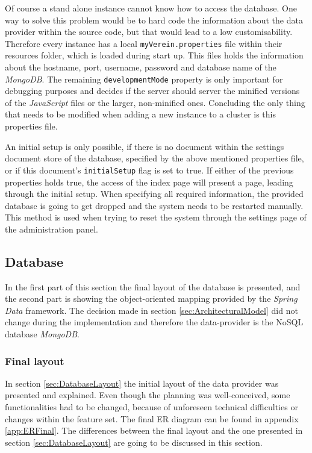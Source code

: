 Of course a stand alone instance cannot know how to access the database. One way to solve this problem would be to hard code the information about the data provider within the source code, but that would lead to a low customisability. Therefore every instance has a local \texttt{myVerein.properties} file within their resources folder, which is loaded during start up. This files holds the information about the hostname, port, username, password and database name of the \emph{MongoDB}. The remaining \texttt{developmentMode} property is only important for debugging purposes and decides if the server should server the minified versions of the \emph{JavaScript} files or the larger, non-minified ones. Concluding the only thing that needs to be modified when adding a new instance to a cluster is this properties file.

An initial setup is only possible, if there is no document within the settings document store of the database, specified by the above mentioned properties file, or if this document's \texttt{initialSetup} flag is set to true. If either of the previous properties holds true, the access of the index page will present a page, leading through the initial setup. When specifying all required information, the provided database is going to get dropped and the system needs to be restarted manually. This method is used when trying to reset the system through the settings page of the administration panel. 

\subsection{Database}
\label{sec:ImplementationDB}

In the first part of this section the final layout of the database is presented, and the second part is showing the object-oriented mapping provided by the \emph{Spring Data} framework. The decision made in section \vref{sec:ArchitecturalModel} did not change during the implementation and therefore the data-provider is the \gls{NoSQL} database \emph{MongoDB}.

\subsubsection{Final layout}
\label{sec:DatabaseFinal}

In section \vref{sec:DatabaseLayout} the initial layout of the data provider was presented and explained. Even though the planning was well-conceived, some functionalities had to be changed, because of unforeseen technical difficulties or changes within the feature set. The final \gls{ER} diagram can be found in appendix \vref{app:ERFinal}. The differences between the final layout and the one presented in section \vref{sec:DatabaseLayout} are going to be discussed in this section.


